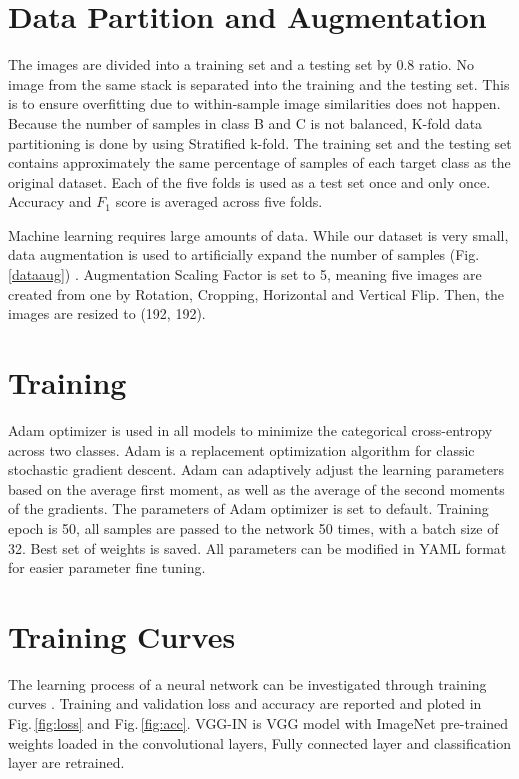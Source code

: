 \section{Data Partition and Augmentation}
The images are divided into a training set and a testing set by 0.8 ratio. No image from the same stack is separated into the training and the testing set. This is to ensure overfitting due to within-sample image similarities does not happen. Because the number of samples in class B and C is not balanced, K-fold data partitioning is done by using Stratified k-fold. The training set and the testing set contains approximately the same percentage of samples of each target class as the original dataset. Each of the five folds is used as a test set once and only once. Accuracy and $F_1$ score is averaged across five folds.

Machine learning requires large amounts of data. While our dataset is very small, data augmentation is used to artificially expand the number of samples (Fig.\,\ref{dataaug}) . Augmentation Scaling Factor is set to 5, meaning five images are created from one by Rotation, Cropping, Horizontal and Vertical Flip. Then, the images are resized to (192, 192).

\section{Training}
Adam \citep{adam} optimizer is used in all models to minimize the categorical cross-entropy across two classes. Adam is a replacement optimization algorithm for classic stochastic gradient descent. Adam can adaptively adjust the learning parameters based on the average first moment, as well as the average of the second moments of the gradients. The parameters of Adam optimizer is set to default. Training epoch is 50, all samples are passed to the network 50 times, with a batch size of 32. Best set of weights is saved. All parameters can be modified in YAML format for easier parameter fine tuning.


\section{Training Curves}
The learning process of a neural network can be investigated through training curves \citep{Anzanello2011}. Training and validation loss and accuracy are reported and ploted in Fig.\,\ref{fig:loss} and Fig.\,\ref{fig:acc}. VGG-IN is VGG model with ImageNet pre-trained weights loaded in the convolutional layers, Fully connected layer and classification layer are retrained.

